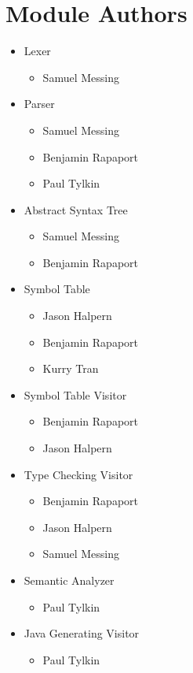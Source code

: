 \documentclass{report}
\begin{document}
\section{Module Authors}\begin{itemize}  \item Lexer    \begin{itemize}      \item Samuel Messing    \end{itemize}        \item Parser    \begin{itemize}      \item Samuel Messing      \item Benjamin Rapaport      \item Paul Tylkin    \end{itemize}         \item Abstract Syntax Tree    \begin{itemize}      \item Samuel Messing      \item Benjamin Rapaport    \end{itemize}         \item Symbol Table    \begin{itemize}      \item Jason Halpern      \item Benjamin Rapaport      \item Kurry Tran    \end{itemize}         \item Symbol Table Visitor    \begin{itemize}      \item Benjamin Rapaport      \item Jason Halpern    \end{itemize}        \item Type Checking Visitor    \begin{itemize}      \item Benjamin Rapaport      \item Jason Halpern      \item Samuel Messing    \end{itemize}        \item Semantic Analyzer    \begin{itemize}      \item Paul Tylkin    \end{itemize}        \item Java Generating Visitor    \begin{itemize}      \item Paul Tylkin    \end{itemize}        \end{itemize}
\end{document}
